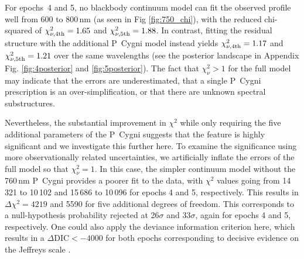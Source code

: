 \documentclass{aa}
\begin{document}
For epochs~4 and 5, no blackbody continuum model can fit the observed profile well from 600 to 800\,nm (as seen in Fig \ref{fig:750_chi}), with the reduced chi-squared of $\chi_{\rm \nu,4th}^2=1.65$ and $\chi_{\rm \nu,5th}^2=1.88$. In contrast, fitting the residual structure with the additional P~Cygni model instead yields $\chi_{\rm \nu,4th}^2=1.17$ and $\chi_{\rm \nu,5th}^2=1.21$ over the same wavelengths (see the posterior landscape in Appendix Fig. \ref{fig:4posterior} and \ref{fig:5posterior}). The fact that $\chi_\nu^2>1$ for the full model may indicate that the errors are underestimated, that a single P~Cygni prescription is an over-simplification, or that there are unknown spectral substructures. 

Nevertheless, the substantial improvement in $\chi^2$ while only requiring the five additional parameters of the P~Cygni suggests that the feature is highly significant and we investigate this further here. 
To examine the significance using more observationally related uncertainties, we artificially inflate the errors of the full model so that $\chi^2_\nu=1$. In this case, the simpler continuum model without the 760\,nm P~Cygni provides a poorer fit to the data, with $\chi^2$ values going from 14\,321 to 10\,102 and 15\,686 to 10\,096 for epochs 4 and 5, respectively. This results in $\Delta\chi^2=4219$ and 5590 for five additional degrees of freedom. This corresponds to a null-hypothesis probability rejected at 26$\sigma$ and 33$\sigma$, again for epochs 4 and 5, respectively. One could also apply the deviance information criterion \citep[DIC; see e.g.][]{Liddle2007} here, which results in a \(\Delta\mathrm{DIC} < -4000\) for both epochs corresponding to decisive evidence on the Jeffreys scale \citep[e.g.][]{Jeffreys1939,Kass1995}.
\end{document}
